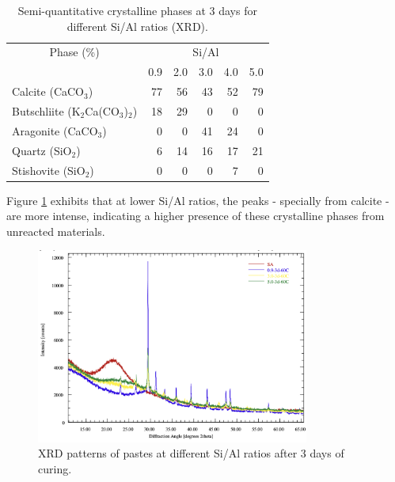 \begin{table}[H]
    \centering
    \caption{Semi-quantitative crystalline phases at 3 days for different Si/Al ratios (XRD).}
    \label{tab:xrd_phases_pastes}
    \begin{tabular}{lrrrrr}
        \hline
        \multicolumn{1}{c}{Phase (\%)} &
        \multicolumn{5}{c}{Si/Al}\\
        \cline{2-6}
        & 0.9 & 2.0 & 3.0 & 4.0 & 5.0 \\
        \hline
        Calcite (CaCO$_3$) & 77 & 56 & 43 & 52 & 79 \\
        Butschliite (K$_2$Ca(CO$_3$)$_2$) & 18 & 29 & 0 & 0 & 0 \\
        Aragonite (CaCO$_3$) & 0 & 0 & 41 & 24 & 0 \\
        Quartz (SiO$_2$) & 6 & 14 & 16 & 17 & 21 \\
        Stishovite (SiO$_2$) & 0 & 0 & 0 & 7 & 0 \\
        \hline
    \end{tabular}
\end{table}

Figure \ref{fig:xrd_pastes} exhibits that at lower Si/Al ratios, the peaks - specially from calcite - are more intense, indicating a higher presence of these crystalline phases from unreacted materials.


\begin{figure}[H]
    \centering
    \includegraphics[width=0.8\textwidth]{Cap4/images/xrd_pastes.png}
    \caption{XRD patterns of pastes at different Si/Al ratios after 3 days of curing.}
    \label{fig:xrd_pastes}
\end{figure}


